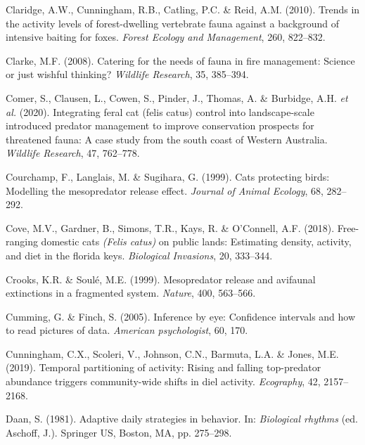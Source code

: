 \documentclass[11pt,a4paper,titlepage,twoside,openright]{style/unimelbthesis}
\begin{document}
\begin{mainmatter}
\leavevmode\hypertarget{ref-claridge2010trends}{}%
Claridge, A.W., Cunningham, R.B., Catling, P.C. \& Reid, A.M. (2010). Trends in the activity levels of forest-dwelling vertebrate fauna against a background of intensive baiting for foxes. \emph{Forest Ecology and Management}, 260, 822--832.

\leavevmode\hypertarget{ref-clarke2008catering}{}%
Clarke, M.F. (2008). Catering for the needs of fauna in fire management: Science or just wishful thinking? \emph{Wildlife Research}, 35, 385--394.

\leavevmode\hypertarget{ref-comer2020integrating}{}%
Comer, S., Clausen, L., Cowen, S., Pinder, J., Thomas, A. \& Burbidge, A.H. \emph{et al.} (2020). Integrating feral cat (felis catus) control into landscape-scale introduced predator management to improve conservation prospects for threatened fauna: A case study from the south coast of Western Australia. \emph{Wildlife Research}, 47, 762--778.

\leavevmode\hypertarget{ref-courchamp1999cats}{}%
Courchamp, F., Langlais, M. \& Sugihara, G. (1999). Cats protecting birds: Modelling the mesopredator release effect. \emph{Journal of Animal Ecology}, 68, 282--292.

\leavevmode\hypertarget{ref-cove2018free}{}%
Cove, M.V., Gardner, B., Simons, T.R., Kays, R. \& O'Connell, A.F. (2018). Free-ranging domestic cats \emph{(Felis catus)} on public lands: Estimating density, activity, and diet in the florida keys. \emph{Biological Invasions}, 20, 333--344.

\leavevmode\hypertarget{ref-crooks1999mesopredator}{}%
Crooks, K.R. \& Soulé, M.E. (1999). Mesopredator release and avifaunal extinctions in a fragmented system. \emph{Nature}, 400, 563--566.

\leavevmode\hypertarget{ref-cumming2005inference}{}%
Cumming, G. \& Finch, S. (2005). Inference by eye: Confidence intervals and how to read pictures of data. \emph{American psychologist}, 60, 170.

\leavevmode\hypertarget{ref-cunningham2019temporal}{}%
Cunningham, C.X., Scoleri, V., Johnson, C.N., Barmuta, L.A. \& Jones, M.E. (2019). Temporal partitioning of activity: Rising and falling top-predator abundance triggers community-wide shifts in diel activity. \emph{Ecography}, 42, 2157--2168.

\leavevmode\hypertarget{ref-daan1981adaptive}{}%
Daan, S. (1981). Adaptive daily strategies in behavior. In: \emph{Biological rhythms} (ed. Aschoff, J.). Springer US, Boston, MA, pp. 275--298.


\end{mainmatter}
\end{document}
